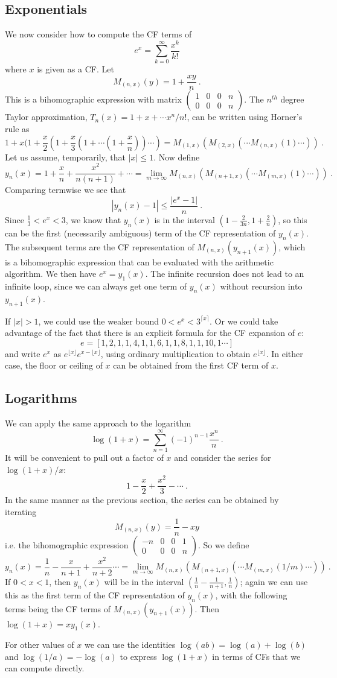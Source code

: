 \documentclass[11pt, oneside]{amsart}   	%
\newcommand{\bihomographic}[8]{\left(\begin{smallmatrix}#1&#2&#3&#4\\#5&#6&#7&#8\end{smallmatrix}\right)}
\renewcommand{\:}{\negthickspace:\negthickspace}
\begin{document}
\subsection{Exponentials} We now consider how to compute the CF terms of 
\[
e^x = \sum_{k=0}^{\infty} \frac{x^k}{k!}
\]
where $x$ is given as a CF. Let
\[
M_{(n,x)}(y) = 1 + \frac{xy}{n} \ .
\]
This is a bihomographic expression with matrix $\bihomographic{1}{0}{0}{n}{0}{0}{0}{n}$. The $n^{th}$ degree Taylor approximation,
$T_n(x)=1 + x + \cdots x^n/{n!}$, can be written using Horner's rule as
\[
 1 + x(1 + \frac{x}{2}( 1 + \frac{x}{3}(1 + \cdots (1 + \frac{x}{n}))\cdots ) = M_{(1,x)}( M_{(2,x)}( \cdots M_{(n,x)}(1) \cdots ) ) \ .
 \]
 Let us assume, temporarily, that $|x| \leq 1$.
 Now define
 \[
 y_n(x) = 1 + \frac{x}{n} + \frac{x^2}{n(n+1)} + \cdots = \lim_{m\to\infty} M_{(n,x)}( M_{(n+1,x)}( \cdots M_{(m,x)}(1) \cdots ) ) \ .
  \]
 Comparing termwise we see that
 \[
 |y_n(x) - 1| \leq \frac{|e^x - 1|}{n} \ .
 \]
Since $\frac{1}{3} < e^x < 3$, we know that $y_n(x)$ is in the interval $(1 - \frac{2}{3n}, 1 + \frac{2}{n})$, so this can be the first (necessarily ambiguous) term of the CF representation of $y_n(x)$.
The subsequent terms are the CF representation of $M_{(n,x)}(y_{n+1}(x))$, which is a bihomographic expression that can be evaluated with the arithmetic algorithm. We then have $e^x = y_1(x)$. The infinite recursion does not lead to an infinite loop, since we can always get one term of $y_n(x)$ without recursion into $y_{n+1}(x)$.

If $|x|>1$, we could use the weaker bound $0 < e^x < 3^{\lceil x \rceil}$. Or we could take advantage of the fact that there is an explicit formula for the CF expansion of $e$:
\[
e = [1,2,1,1,4,1,1,6,1,1,8,1,1,10,1 \cdots ]
\]
and write $e^x$ as $e^{\lfloor x \rfloor}e^{x-\lfloor x \rfloor}$, using ordinary multiplication to obtain $e^{\lfloor x \rfloor}$. In either case, the floor or ceiling of $x$ can be obtained from the first CF term of $x$.

\subsection{Logarithms} We can apply the same approach to the logarithm
\[
\log (1+x) = \sum_{n=1}^{\infty} (-1)^{n-1}\frac{x^n}{n} \ .
\]
It will be convenient to pull out a factor of $x$ and consider the series for $\log(1+x)/x$:
\[
1 - \frac{x}{2} + \frac{x^2}{3} - \cdots \ .
\]
In the same manner as the previous section, the series can be obtained by iterating
\[
M_{(n,x)}(y) = \frac{1}{n} - xy 
\]
i.e. the bihomographic expression $\bihomographic{-n}{0}{0}{1}{0}{0}{0}{n}$.
So we define
\[
y_n(x) = \frac{1}{n} - \frac{x}{n+1} + \frac{x^2}{n+2} \cdots = \lim_{m\to\infty} M_{(n,x)}( M_{(n+1,x)}( \cdots M_{(m,x)}(1/m) \cdots ) ) \ .
\]
If $0 < x < 1$, then $y_n(x)$ will be in the interval $(\frac{1}{n} - \frac{1}{n+1}, \frac{1}{n})$;
again we can use this as the first term of the CF representation of $y_n(x)$, with the following terms being the CF terms of $M_{(n,x)}(y_{n+1}(x))$. Then $\log (1+x) = xy_1(x)$.

For other values of $x$  we can use the identities $\log(ab)=\log(a)+\log(b)$ and $\log(1/a) = -\log(a)$ to express $\log(1+x)$ in terms of CFs that we can compute directly. 



\end{document}
